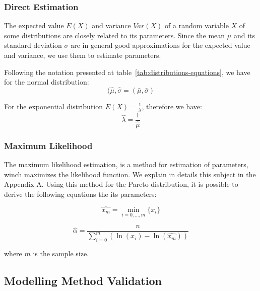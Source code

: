 \subsubsection{Direct Estimation}

The expected value $E(X)$ and variance $Var(X)$ of a random variable $X$ of some distributions are closely related to its parameters. Since the mean $\bar{\mu}$ and its standard deviation $\bar{\sigma}$ are in general good approximations for the expected value and variance, we use them to estimate parameters.

Following the notation presented at table~\ref{tab:distributions-equations}, we have for the normal distribution:
\begin{equation}
(\hat{\mu}, \hat{\sigma} = (\bar{\mu}, \bar{\sigma})
\end{equation}

For the exponential distribution $E(X) = \frac{1}{\lambda}$, therefore we have:
\begin{equation}
\hat{\lambda} = \frac{1}{\hat{\mu}}
\end{equation} 

\subsubsection{Maximum Likelihood}

The maximum likelihood estimation, is a method for estimation of parameters, winch maximizes the likelihood function. We explain in details this subject in the Appendix A. Using this method for the Pareto distribution, it is possible to derive the following equations the its parameters:

\begin{equation}
\hat{x_{m}} = \min_{i = 0, ..., m}\{x_{i}\}
\end{equation} 

\begin{equation}
\hat{\alpha} = \frac{n}{ \sum_{i = 0}^{m}(\ln{(x_{i}) - \ln(\hat{x_{m}})})  }
\end{equation} 

where $m$ is the sample size.




\subsection{Modelling Method Validation}

